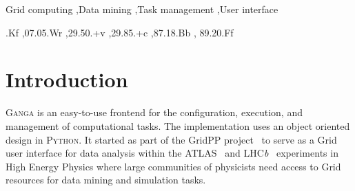 \documentclass{elsart}
\def\lhcb {LHC{\em b\/}\xspace}
\def\atlas {ATLAS\xspace}
\def\ganga {\textsc{Ganga}\xspace}
\def\python {\textsc{Python}\xspace}
\def\grid {Grid\xspace}
\begin{document}
\begin{frontmatter}
\begin{abstract}
  We present the computational task-management tool \ganga which allows for
  the specification, submission, bookkeeping and post processing of
  computational tasks on a wide set of distributed resources.  \ganga
  effectively provides a homogeneous environment for processing data on
  inhomogeneous resources. We provide examples from High Energy Physics,
  demonstrating how an analysis can be developed on a local system and then
  transparently moved to a \grid system for processing of all available data.
  \ganga offers an API which can be used via an interactive interface, in
  scripts, or through a GUI. Specific knowledge about types of tasks or
  computational resources is provided at run-time through a plug-in system, 
  making new developments easy to integrate. We give an overview of the
  \ganga architecture, give examples of current use, and demonstrate how
  \ganga can be used in many different areas of science.
\end{abstract}

\begin{keyword}
Grid computing \sep Data mining \sep Task management \sep User interface





  .Kf \sep 07.05.Wr \sep 29.50.+v \sep 29.85.+c \sep 87.18.Bb \sep
  89.20.Ff
\end{keyword}
\end{frontmatter}


\section{Introduction}
\label{sec:intro}
\ganga is an easy-to-use frontend for the configuration, execution, and
management of computational tasks. The implementation uses an object oriented
design in \python. It started as part of the GridPP
project~\cite{Faulkner:2006px} to serve as a \grid user interface for data
analysis within the \atlas~\cite{Armstrong:1994it} and
\lhcb~\cite{Amato:1998xt} experiments in High Energy Physics where large
communities of physicists need access to \grid resources for data mining
and simulation tasks.
\end{document}
